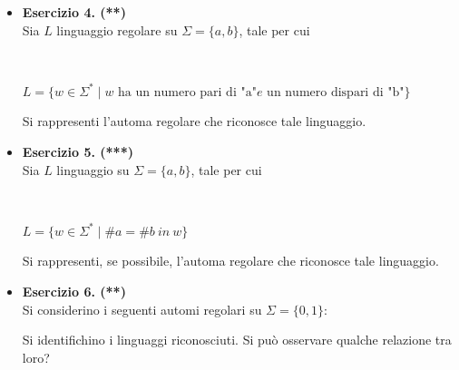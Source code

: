 \documentclass[a4paper,10pt]{article}
\begin{document}
{\begin{itemize}[label=, leftmargin=0pt]
    
 
    
    \item \textbf{Esercizio 4. (**)}\\ Sia $L$ linguaggio regolare su $\Sigma=\{a,b\}$, tale per cui 
    {\\ \begin{center}
        $L = \{ w \in \Sigma^*\mid w \text{\ ha\ un\ numero\ pari\ di\ "a"} e\text{\ un\ numero\ dispari\ di\ "b"}\}$
    \end{center}} 
    Si rappresenti l'automa regolare che riconosce tale linguaggio.



    \item \textbf{Esercizio 5. (***)}\\ Sia $L$ linguaggio su $\Sigma=\{a,b\}$, tale per cui 
    {\\ \begin{center}
        $L = \{ w \in \Sigma^* \mid \#a = \#b\ in\ w\}$
    \end{center}} 
    Si rappresenti, se possibile, l'automa regolare che riconosce tale linguaggio.

    \item \textbf{Esercizio 6. (**)}\\
    Si considerino i seguenti automi regolari su $\Sigma = \{0,1\}$:
    {
    \small
    \begin{center}
    \end{center}
    }
    Si identifichino i linguaggi riconosciuti. Si può osservare qualche relazione tra loro?


\end{itemize}}
\end{document}
